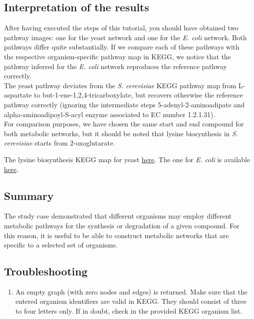 \subsection{Interpretation of the results}

After having executed the steps of this tutorial, you should have obtained two pathway images:
one for the yeast network and one for the \textit{E. coli} network. Both pathways differ quite substantially.
If we compare each of these pathways with the respective organism-specific pathway map in KEGG, we notice that
the pathway inferred for the \textit{E. coli} network reproduces the reference pathway correctly.\\
The yeast pathway deviates from the \textit{S. cerevisiae} KEGG pathway map from L-aspartate to but-1-ene-1,2,4-tricarboxylate,
but recovers otherwise the reference pathway correctly (ignoring the intermediate steps 5-adenyl-2-aminoadipate and
alpha-aminoadipoyl-S-acyl enzyme associated to EC number 1.2.1.31). \\
For comparison purposes, we have chosen the same start and end compound for both metabolic networks, but it should
be noted that lysine biosynthesis in \textit{S. cerevisiae} starts from 2-oxoglutarate.

The lysine biosynthesis KEGG map for yeast \href{http://www.genome.ad.jp/dbget-bin/get_pathway?org_name=sce&mapno=00300}{here}.
The one for \textit{E. coli} is available \href{http://www.genome.ad.jp/dbget-bin/get_pathway?org_name=eco&mapno=00300}{here}.


\subsection{Summary}

The study case demonstrated that different organisms may employ different metabolic pathways for the synthesis or
degradation of a given compound. For this reason, it is useful to be able to construct metabolic networks that are
specific to a selected set of organisms.

\subsection{Troubleshooting}

\begin{enumerate}

\item An empty graph (with zero nodes and edges) is returned.
Make sure that the entered organism identifiers are valid in KEGG.
They should consist of three to four letters only. If in doubt,
check in the provided KEGG organism list.

\end{enumerate}
